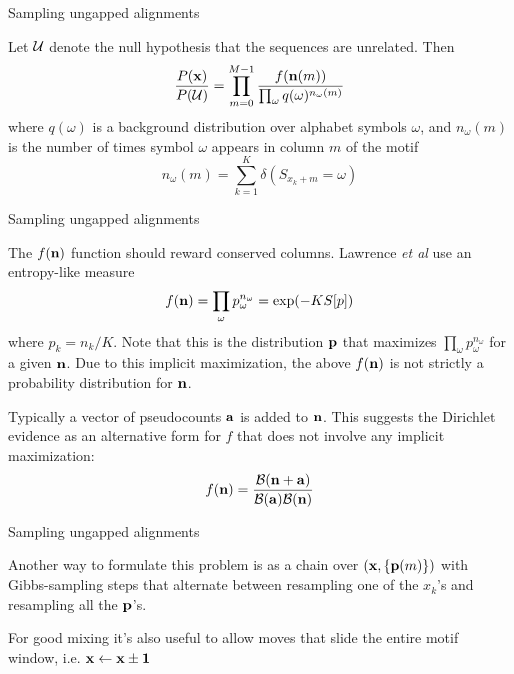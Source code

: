 \documentclass{beamer}
\begin{document}
\begin{frame}{Sampling ungapped alignments}

\itemb
 \item Let ${\cal U}$ denote the null hypothesis that the sequences are unrelated. Then
\[
\frac{P({\bf x})}{P({\cal U})} = \prod_{m=0}^{M-1} \frac{f({\bf n}(m))}{\prod_\omega q(\omega)^{n_\omega(m)}}
\]
where $q(\omega)$ is a background distribution over alphabet symbols $\omega$, and $n_{\omega}(m)$ is the number of times symbol $\omega$ appears in column $m$ of the motif
\[
n_{\omega}(m) = \sum_{k=1}^K \delta(S_{x_k + m} = \omega)
\]
\iteme

\end{frame}


\begin{frame}{Sampling ungapped alignments}

\itemb
\item The $f({\bf n})$ function should reward conserved columns.
Lawrence {\em et al} use an entropy-like measure
\[
f({\bf n}) = \prod_\omega p_\omega^{n_\omega} = \exp (-KS[p])
\]
where $p_k = n_k/K$.
Note that this is the distribution ${\bf p}$ that maximizes $\prod_\omega p_\omega^{n_\omega}$ for a given ${\bf n}$.
Due to this implicit maximization, the above $f({\bf n})$ is not strictly a probability distribution for ${\bf n}$.
 \item Typically a vector of pseudocounts ${\bf a}$ is added to ${\bf n}$.
This suggests the Dirichlet evidence as an alternative form for $f$ that does not involve any implicit maximization:
\[
f({\bf n}) = \frac{{\cal B}({\bf n} + {\bf a})}{{\cal B}({\bf a}){\cal B}({\bf n})}
\]
\iteme

\end{frame}


\begin{frame}{Sampling ungapped alignments}

\itemb
 \item Another way to formulate this problem is as a chain over $({\bf x},\{{\bf p}(m)\})$ with Gibbs-sampling steps that alternate between resampling one of the $x_k$'s and resampling all the ${\bf p}$'s.
 \item For good mixing it's also useful to allow moves that slide the entire motif window, i.e. ${\bf x} \leftarrow {\bf x} \pm {\bf 1}$
\iteme

\end{frame}
\end{document}
